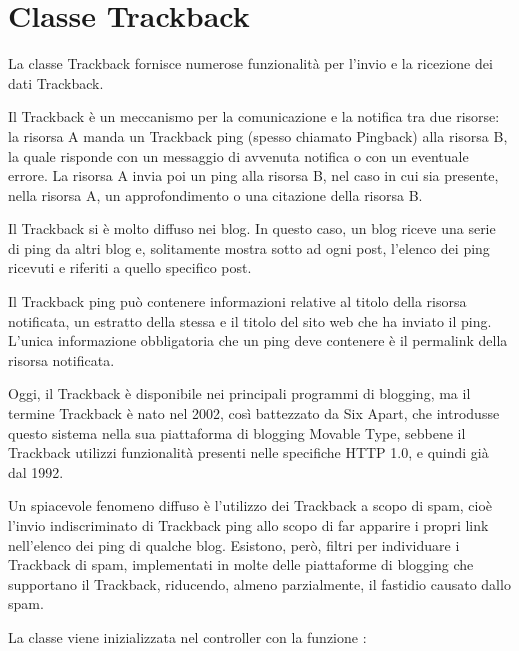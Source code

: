 \section{Classe Trackback}
\label{class:trackback}

La classe Trackback fornisce numerose funzionalità per l'invio e la ricezione dei dati Trackback.

Il Trackback è un meccanismo per la comunicazione e la notifica tra due risorse: la risorsa A manda un Trackback ping (spesso chiamato Pingback) alla risorsa B, la quale risponde con un messaggio di avvenuta notifica o con un eventuale errore. La risorsa A invia poi un ping alla risorsa B, nel caso in cui sia presente, nella risorsa A, un approfondimento o una citazione della risorsa B.

Il Trackback si è molto diffuso nei blog. In questo caso, un blog riceve una serie di ping da altri blog e, solitamente mostra sotto ad ogni post, l'elenco dei ping ricevuti e riferiti a quello specifico post.

Il Trackback ping può contenere informazioni relative al titolo della risorsa notificata, un estratto della stessa e il titolo del sito web che ha inviato il ping. L'unica informazione obbligatoria che un ping deve contenere è il permalink della risorsa notificata.

Oggi, il Trackback è disponibile nei principali programmi di blogging, ma il termine Trackback è nato nel 2002, così battezzato da Six Apart, che introdusse questo sistema nella sua piattaforma di blogging Movable Type, sebbene il Trackback utilizzi funzionalità presenti nelle specifiche HTTP 1.0, e quindi già dal 1992.

Un spiacevole fenomeno diffuso è l'utilizzo dei Trackback a scopo di spam, cioè l'invio indiscriminato di Trackback ping allo scopo di far apparire i propri link nell'elenco dei ping di qualche blog. Esistono, però, filtri per individuare i Trackback di spam, implementati in molte delle piattaforme di blogging che supportano il Trackback, riducendo, almeno parzialmente, il fastidio causato dallo spam.


La classe viene inizializzata nel controller con la funzione :


